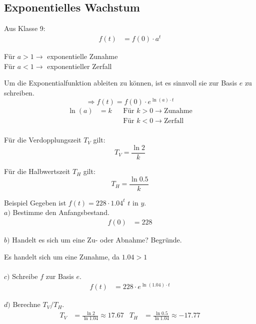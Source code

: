 \documentclass{article}
\begin{document}
\subsection{Exponentielles Wachstum}
Aus Klasse 9:
\begin{align*}
    f(t) &= f(0) \cdot a^t
\end{align*}
\begin{center}
    Für $a>1 \rightarrow$ exponentielle Zunahme \\
    Für $a<1 \rightarrow$ exponentieller Zerfall \\
\end{center}
\vspace{3mm}
Um die Exponentialfunktion ableiten zu können, ist es sinnvoll
sie zur Basis $e$ zu schreiben.
\[\Rightarrow f(t)=f(0)\cdot e^{\ln (a) \cdot t}\]
\begin{align*}
    &&&& \ln(a)&=k & &\text{Für }k>0 \rightarrow \text{Zunahme}&&&& \\
    &&&& & & &\text{Für }k<0 \rightarrow \text{Zerfall}&&&& \\
\end{align*}

Für die Verdopplungszeit $T_V$ gilt:
\[T_V = \frac{\ln 2}{k}\]

Für die Halbwertszeit $T_H$ gilt:
\[T_H = \frac{\ln 0.5}{k}\]

\begin{boxx}[DarkBlue]{Beispiel}
    Gegeben ist $f(t) = 228 \cdot 1.04^t$  $t$ in $y$. \\
    $a)$\hspace{3mm} Bestimme den Anfangsbestand.
    \begin{align*}
        f(0) &= 228
    \end{align*}

    $b)$\hspace{3mm} Handelt es sich um eine Zu- oder Abnahme? Begründe.

    Es handelt sich um eine Zunahme, da $1.04 > 1$ \\\\

    $c)$\hspace{3mm} Schreibe $f$ zur Basis $e$.
    \begin{align*}
        f(t) &= 228 \cdot e^{\ln(1.04)\cdot t}
    \end{align*}

    $d)$\hspace{3mm} Berechne $T_V/T_H$.
    \begin{align*}
        T_V&= \frac{\ln 2}{\ln 1.04} \approx 17.67 & T_H&= \frac{\ln 0.5}{\ln 1.04} \approx -17.77
    \end{align*}
\end{boxx}
\end{document}
